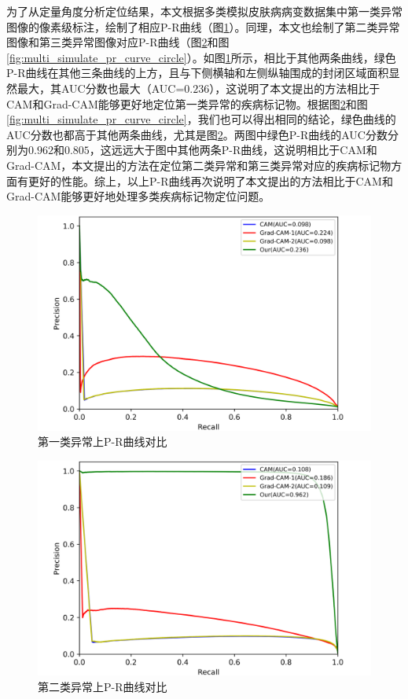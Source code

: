 为了从定量角度分析定位结果，本文根据多类模拟皮肤病病变数据集中第一类异常图像的像素级标注，绘制了相应P-R曲线（图\ref{fig:multi_simulate_pr_curve_image_net}）。同理，本文也绘制了第二类异常图像和第三类异常图像对应P-R曲线（图\ref{fig:multi_simulate_pr_curve_skin}和图\ref{fig:multi_simulate_pr_curve_circle}）。如图\ref{fig:multi_simulate_pr_curve_image_net}所示，相比于其他两条曲线，绿色P-R曲线在其他三条曲线的上方，且与下侧横轴和左侧纵轴围成的封闭区域面积显然最大，其AUC分数也最大（AUC=$0.236$），这说明了本文提出的方法相比于CAM和Grad-CAM能够更好地定位第一类异常的疾病标记物。根据图\ref{fig:multi_simulate_pr_curve_skin}和图\ref{fig:multi_simulate_pr_curve_circle}，我们也可以得出相同的结论，绿色曲线的AUC分数也都高于其他两条曲线，尤其是图\ref{fig:multi_simulate_pr_curve_skin}。两图中绿色P-R曲线的AUC分数分别为$0.962$和$0.805$，这远远大于图中其他两条P-R曲线，这说明相比于CAM和Grad-CAM，本文提出的方法在定位第二类异常和第三类异常对应的疾病标记物方面有更好的性能。综上，以上P-R曲线再次说明了本文提出的方法相比于CAM和Grad-CAM能够更好地处理多类疾病标记物定位问题。
\begin{figure}[H]
	\centering
	\includegraphics[width=1.0\textwidth]{figure/pr_curve_multi_skin/IMAGE_NET_pr_curve.png}
	\caption{第一类异常上P-R曲线对比} 
	\label{fig:multi_simulate_pr_curve_image_net}
\end{figure}
\vspace{-0.5cm}
\begin{figure}[H]
	\centering
	\includegraphics[width=1.0\textwidth]{figure/pr_curve_multi_skin/SKIN_pr_curve.png}
	\caption{第二类异常上P-R曲线对比} 
	\label{fig:multi_simulate_pr_curve_skin}
\end{figure}
